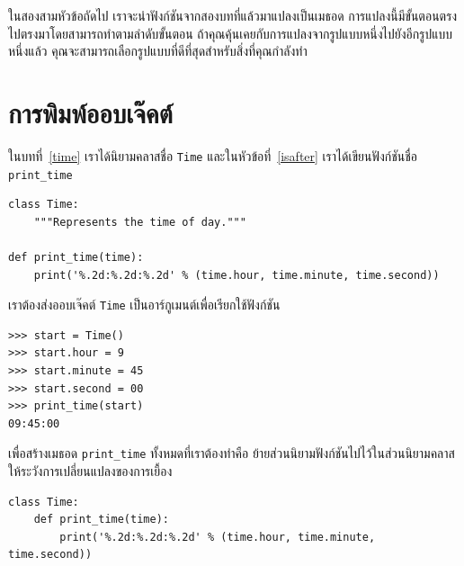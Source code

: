 ในสองสามหัวข้อถัดไป เราจะนำฟังก์ชันจากสองบทที่แล้วมาแปลงเป็นเมธอด 
การแปลงนี้มีขั้นตอนตรงไปตรงมาโดยสามารถทำตามลำดับขั้นตอน 
ถ้าคุณคุ้นเคยกับการแปลงจากรูปแบบหนึ่งไปยังอีกรูปแบบหนึ่งแล้ว คุณจะสามารถเลือกรูปแบบที่ดีที่สุดสำหรับสิ่งที่คุณกำลังทำ


\section{การพิมพ์ออบเจ๊คต์ } %


ในบทที่~\ref{time} เราได้นิยามคลาสชื่อ {\tt Time} และในหัวข้อที่~\ref{isafter} เราได้เขียนฟังก์ชันชื่อ \verb|print_time|

\begin{verbatim}
class Time:
    """Represents the time of day."""

def print_time(time):
    print('%.2d:%.2d:%.2d' % (time.hour, time.minute, time.second))
\end{verbatim}
%

เราต้องส่งออบเจ๊คต์ {\tt Time} เป็นอาร์กูเมนต์เพื่อเรียกใช้ฟังก์ชัน

\begin{verbatim}
>>> start = Time()
>>> start.hour = 9
>>> start.minute = 45
>>> start.second = 00
>>> print_time(start)
09:45:00
\end{verbatim}
%

เพื่อสร้างเมธอด \verb|print_time| ทั้งหมดที่เราต้องทำคือ ย้ายส่วนนิยามฟังก์ชันไปไว้ในส่วนนิยามคลาส ให้ระวังการเปลี่ยนแปลงของการเยื้อง


\begin{verbatim}
class Time:
    def print_time(time):
        print('%.2d:%.2d:%.2d' % (time.hour, time.minute, time.second))
\end{verbatim}
%

